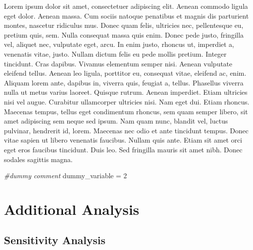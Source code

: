 \documentclass[]{book}
\newenvironment{Shaded}{\begin{snugshade}}{\end{snugshade}}
\newcommand{\DecValTok}[1]{\textcolor[rgb]{0.00,0.00,0.81}{#1}}
\newcommand{\StringTok}[1]{\textcolor[rgb]{0.31,0.60,0.02}{#1}}
\newcommand{\CommentTok}[1]{\textcolor[rgb]{0.56,0.35,0.01}{\textit{#1}}}
\newcommand{\NormalTok}[1]{#1}
\begin{document}
Lorem ipsum dolor sit amet, consectetuer adipiscing elit. Aenean commodo
ligula eget dolor. Aenean massa. Cum sociis natoque penatibus et magnis
dis parturient montes, nascetur ridiculus mus. Donec quam felis,
ultricies nec, pellentesque eu, pretium quis, sem. Nulla consequat massa
quis enim. Donec pede justo, fringilla vel, aliquet nec, vulputate eget,
arcu. In enim justo, rhoncus ut, imperdiet a, venenatis vitae, justo.
Nullam dictum felis eu pede mollis pretium. Integer tincidunt. Cras
dapibus. Vivamus elementum semper nisi. Aenean vulputate eleifend
tellus. Aenean leo ligula, porttitor eu, consequat vitae, eleifend ac,
enim. Aliquam lorem ante, dapibus in, viverra quis, feugiat a, tellus.
Phasellus viverra nulla ut metus varius laoreet. Quisque rutrum. Aenean
imperdiet. Etiam ultricies nisi vel augue. Curabitur ullamcorper
ultricies nisi. Nam eget dui. Etiam rhoncus. Maecenas tempus, tellus
eget condimentum rhoncus, sem quam semper libero, sit amet adipiscing
sem neque sed ipsum. Nam quam nunc, blandit vel, luctus pulvinar,
hendrerit id, lorem. Maecenas nec odio et ante tincidunt tempus. Donec
vitae sapien ut libero venenatis faucibus. Nullam quis ante. Etiam sit
amet orci eget eros faucibus tincidunt. Duis leo. Sed fringilla mauris
sit amet nibh. Donec sodales sagittis magna.

\begin{Shaded}
\begin{Highlighting}[]
\CommentTok{#dummy comment }
\NormalTok{dummy_variable =}\StringTok{ }\DecValTok{2}
\end{Highlighting}
\end{Shaded}

\chapter{Additional Analysis}\label{additional-analysis}

\section{Sensitivity Analysis}\label{sensitivity-analysis}
\end{document}
